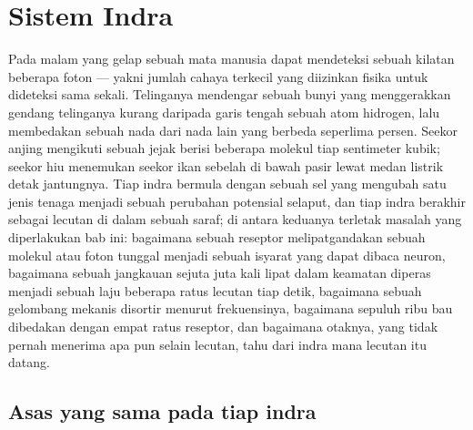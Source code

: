 \chapter{Sistem Indra}\label{ch:b3:sensory-systems}

Pada malam yang gelap sebuah mata manusia dapat mendeteksi sebuah kilatan
beberapa foton --- yakni jumlah cahaya terkecil yang diizinkan fisika untuk
dideteksi sama sekali. Telinganya mendengar sebuah bunyi yang menggerakkan
gendang telinganya kurang daripada garis tengah sebuah atom hidrogen, lalu
membedakan sebuah nada dari nada lain yang berbeda seperlima persen. Seekor
anjing mengikuti sebuah jejak berisi beberapa molekul tiap sentimeter kubik;
seekor hiu menemukan seekor ikan sebelah di bawah pasir lewat medan listrik
detak jantungnya. Tiap indra bermula dengan sebuah sel yang mengubah satu jenis
tenaga menjadi sebuah perubahan potensial selaput, dan tiap indra berakhir
sebagai lecutan di dalam sebuah saraf; di antara keduanya terletak masalah
yang diperlakukan bab ini: bagaimana sebuah reseptor melipatgandakan sebuah
molekul atau foton tunggal menjadi sebuah isyarat yang dapat dibaca neuron,
bagaimana sebuah jangkauan sejuta juta kali lipat dalam keamatan diperas menjadi
sebuah laju beberapa ratus lecutan tiap detik, bagaimana sebuah gelombang mekanis
disortir menurut frekuensinya, bagaimana sepuluh ribu bau dibedakan dengan empat
ratus reseptor, dan bagaimana otaknya, yang tidak pernah menerima apa pun selain
lecutan, tahu dari indra mana lecutan itu datang.

\section{Asas yang sama pada tiap indra}

